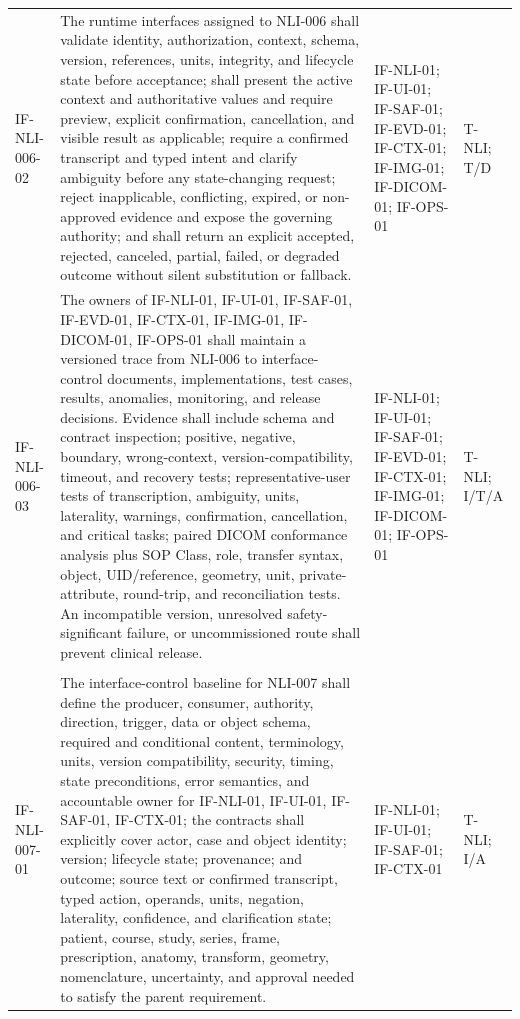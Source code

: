 \documentclass[11pt,letterpaper]{article}
\begin{document}
\begin{scriptsize}
\begin{longtable}{@{}L{0.14\textwidth}L{0.49\textwidth}L{0.19\textwidth}L{0.10\textwidth}@{}}
\mbox{IF-NLI-006-02} & The runtime interfaces assigned to NLI-006 shall validate identity, authorization, context, schema, version, references, units, integrity, and lifecycle state before acceptance; shall present the active context and authoritative values and require preview, explicit confirmation, cancellation, and visible result as applicable; require a confirmed transcript and typed intent and clarify ambiguity before any state-changing request; reject inapplicable, conflicting, expired, or non-approved evidence and expose the governing authority; and shall return an explicit accepted, rejected, canceled, partial, failed, or degraded outcome without silent substitution or fallback. & IF-NLI-01; IF-UI-01; IF-SAF-01; IF-EVD-01; IF-CTX-01; IF-IMG-01; IF-DICOM-01; IF-OPS-01 & T-NLI; T\slash\allowbreak{}D \\
\addlinespace[2pt]
\mbox{IF-NLI-006-03} & The owners of IF-NLI-01, IF-UI-01, IF-SAF-01, IF-EVD-01, IF-CTX-01, IF-IMG-01, IF-DICOM-01, IF-OPS-01 shall maintain a versioned trace from NLI-006 to interface-control documents, implementations, test cases, results, anomalies, monitoring, and release decisions. Evidence shall include schema and contract inspection; positive, negative, boundary, wrong-context, version-compatibility, timeout, and recovery tests; representative-user tests of transcription, ambiguity, units, laterality, warnings, confirmation, cancellation, and critical tasks; paired DICOM conformance analysis plus SOP Class, role, transfer syntax, object, UID\slash\allowbreak{}reference, geometry, unit, private-attribute, round-trip, and reconciliation tests. An incompatible version, unresolved safety-significant failure, or uncommissioned route shall prevent clinical release. & IF-NLI-01; IF-UI-01; IF-SAF-01; IF-EVD-01; IF-CTX-01; IF-IMG-01; IF-DICOM-01; IF-OPS-01 & T-NLI; I\slash\allowbreak{}T\slash\allowbreak{}A \\
\addlinespace[2pt]
 \\
\addlinespace[2pt]
\mbox{IF-NLI-007-01} & The interface-control baseline for NLI-007 shall define the producer, consumer, authority, direction, trigger, data or object schema, required and conditional content, terminology, units, version compatibility, security, timing, state preconditions, error semantics, and accountable owner for IF-NLI-01, IF-UI-01, IF-SAF-01, IF-CTX-01; the contracts shall explicitly cover actor, case and object identity; version; lifecycle state; provenance; and outcome; source text or confirmed transcript, typed action, operands, units, negation, laterality, confidence, and clarification state; patient, course, study, series, frame, prescription, anatomy, transform, geometry, nomenclature, uncertainty, and approval needed to satisfy the parent requirement. & IF-NLI-01; IF-UI-01; IF-SAF-01; IF-CTX-01 & T-NLI; I\slash\allowbreak{}A \\

\end{longtable}
\end{scriptsize}
\end{document}
